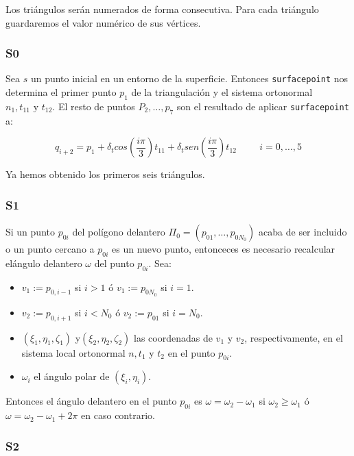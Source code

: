 Los triángulos serán numerados de forma consecutiva. Para cada triángulo guardaremos el valor numérico de sus vértices.

\subsubsection{S0}

Sea $s$ un punto inicial en un entorno de la superficie. Entonces \texttt{surfacepoint} nos determina el primer punto $p_1$ de la triangulación y el sistema ortonormal $n_1, t_{11} \text{ y } t_{12}$. El resto de puntos $P_2, \dotso, p_7$ son el resultado de aplicar \texttt{surfacepoint} a:

$$q_{i+2} = p_1 + \delta_t cos\left(\frac{i \pi}{3}\right)t_{11} + \delta_t sen\left(\frac{i\pi}{3}\right)t_{12} \hspace{1cm} i = 0, \dotso, 5$$

Ya hemos obtenido los primeros seis triángulos.

\subsubsection{S1}

Si un punto $p_{0i}$ del polígono delantero $\Pi_0 = (p_{01}, \dotso, p_{0N_0})$ acaba de ser incluido o un punto cercano a $p_{0i}$ es un nuevo punto, entonceces es necesario recalcular elángulo delantero $\omega$ del punto $p_{0i}$. Sea:

\begin{itemize}
	\item $v_1 := p_{0,i-1}$ si $i>1$ ó $v_1 := p_{0N_0}$ si $i=1$.
	\item $v_2 := p_{0,i+1}$ si $i<N_0$ ó $v_2 := p_{01}$ si $i=N_0$.
	\item $(\xi_1,\eta_1,\zeta_1)$ y$(\xi_2,\eta_2,\zeta_2)$ las coordenadas de $v_1$ y $v_2$, respectivamente, en el sistema local ortonormal $n, t_1$ y $t_2$ en el punto $p_{0i}$.
	\item $\omega_i$ el ángulo polar de $(\xi_i, \eta_i)$. 
\end{itemize}

Entonces el ángulo delantero en el punto $p_{0i}$ es $\omega = \omega_2 - \omega_1$ si $\omega_2 \geq \omega_1$ ó $\omega = \omega_2 - \omega_1 + 2\pi$ en caso contrario.

\subsubsection{S2}

